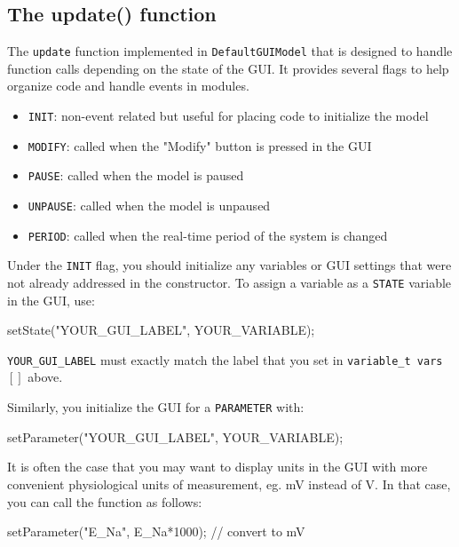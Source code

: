 \subsection{The update() function}
\label{DefaultGUIModel update}

The \texttt{update{}} function implemented in \texttt{DefaultGUIModel} that is designed to handle function calls depending on the state of the GUI. It provides several flags to help organize code and handle events in modules. 
\begin{itemize}
\item \texttt{INIT}: non-event related but useful for placing code to initialize the model
\item \texttt{MODIFY}: called when the "Modify" button is pressed in the GUI
\item \texttt{PAUSE}: called when the model is paused
\item \texttt{UNPAUSE}: called when the model is unpaused
\label{pause flag}\item \texttt{PERIOD}: called when the real-time period of the system is changed
\end{itemize}

Under the \texttt{INIT} flag, you should initialize any variables or GUI settings that were not already addressed in the constructor. To assign a variable as a \texttt{STATE} variable in the GUI, use:

\begin{example}
setState("YOUR\_GUI\_LABEL", YOUR\_VARIABLE);
\end{example}

\attention \texttt{YOUR\_GUI\_LABEL} must exactly match the label that you set in \texttt{variable\_t vars$\left[\right]$} above. 

Similarly, you initialize the GUI for a \texttt{PARAMETER} with:
\begin{example}
setParameter("YOUR\_GUI\_LABEL", YOUR\_VARIABLE);
\end{example}

It is often the case that you may want to display units in the GUI with more convenient physiological units of measurement, eg. mV instead of V. In that case, you can call the function as follows:
\begin{example}
setParameter("E\_Na", E\_Na*1000); // convert to mV\\
\end{example}

